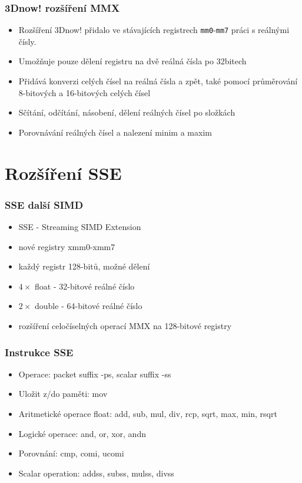 \documentclass{beamer}
\begin{document}
\begin{frame}
\frametitle{3Dnow! rozšíření MMX}
\begin{itemize}
\item Rozšíření 3Dnow! přidalo ve stávajících registrech \texttt{mm0}-\texttt{mm7} práci s reálnými čísly. 
\item Umožňuje pouze dělení registru na dvě reálná čísla po 32bitech
\item Přidává konverzi celých čísel na reálná čísla a zpět, také pomocí průměrování 8-bitových a 16-bitových celých čísel
\item Sčítání, odčítání, násobení, dělení reálných čísel po složkách
\item Porovnávání reálných čísel a nalezení minim a maxim
\end{itemize}
\end{frame}

\section{Rozšíření SSE}


\begin{frame}
\frametitle{SSE další SIMD}
\begin{itemize}
\item SSE - Streaming SIMD Extension
\item nové registry xmm0-xmm7
\item každý registr 128-bitů, možné dělení
\item $4\times$ float - 32-bitové reálné číslo
\item $2\times$ double - 64-bitové reálné číslo
\item rozšíření celočíselných operací MMX na 128-bitové registry
\end{itemize}
\end{frame}



\begin{frame}
\frametitle{Instrukce SSE}
\begin{itemize}

\item Operace: packet suffix -ps, scalar suffix -ss 



\item Uložit z/do paměti: mov
\item Aritmetické operace float: add, sub, mul, div, rcp, sqrt, max, min, rsqrt
\item Logické operace: and, or, xor, andn
\item Porovnání: cmp, comi, ucomi


\item Scalar operation: addss, subss, mulss, divss
\end{itemize}
\end{frame}
\end{document}
